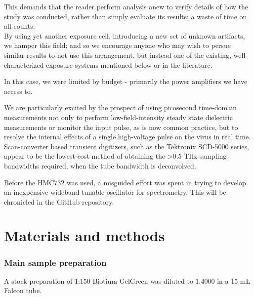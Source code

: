\documentclass[paper.tex]{subfiles}
\begin{document}
\begin{multicols}{1}
\begin{tcolorbox}
	This demands that the reader perform analysis anew to verify details of how the study was conducted, rather than simply evaluate its results; a waste of time on all counts.\\
	
	By using yet another exposure cell, introducing a new set of unknown artifacts, we hamper this field; and so we encourage anyone who may wish to persue similar results to not use this arrangement, but instead one of the existing, well-characterized exposure systems mentioned below or in the literature.
	
	In this case, we were limited by budget - primarily the power amplifiers we have access to.
	
\end{tcolorbox}

We are particularly excited by the prospect of using picosecond time-domain measurements not only to perform low-field-intensity steady state dielectric measurements or monitor the input pulse, as is now common practice, but to resolve the internal effects of a single high-voltage pulse on the virus in real time. Scan-converter based transient digitizers, such as the Tektronix SCD-5000 series, appear to be the lowest-cost method of obtaining the >0.5 THz sampling bandwidths required, when the tube bandwidth is deconvolved.


Before the HMC732 was used, a misguided effort was spent in trying to develop an inexpensive wideband tunable oscillator for spectrometry. This will be chronicled in the GitHub repository.

\section{Materials and methods}

\subsubsection{Main sample preparation}

A stock preparation of 1:150 Biotium GelGreen was diluted to 1:4000 in a 15 mL Falcon tube.


\end{multicols}
\end{document}
